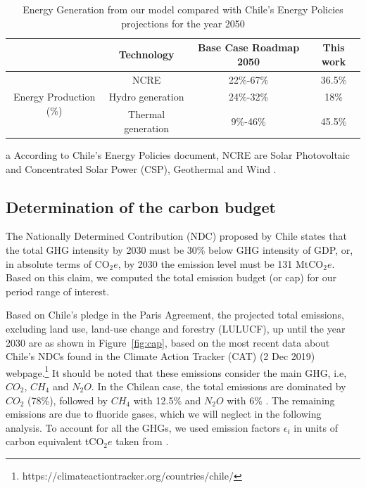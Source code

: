 \documentclass[11pt, letterpaper]{article}
\begin{document}
\begin{table}[!htbp]
\centering
  \begin{threeparttable}[t]
       \begin{tabular}{ c c c c } 
\hline
 & Technology & Base Case Roadmap 2050 & This work \\
\hline
\multirow{4}{8em}{Energy Production (\%)} & NCRE\tnote{a} & 22\%-67\% & 36.5\% \\ 
 & Hydro generation & 24\%-32\% & 18\% \\ 
& Thermal generation & 9\%-46\% & 45.5\% \\
\hline
\end{tabular}
     \begin{tablenotes}
     \footnotesize{
     \item[a] According to Chile's Energy Policies document, NCRE are Solar Photovoltaic and Concentrated Solar Power (CSP), Geothermal and Wind .
     }
   \end{tablenotes}
    \end{threeparttable}%
    \caption{Energy Generation from our model compared with Chile's Energy Policies projections for the year 2050}
  \label{tab:bc_comp}%
\end{table}%



\subsection{Determination of the carbon budget}\label{sec:cap}

The Nationally Determined Contribution (NDC) proposed by Chile states that the total GHG intensity by 2030 must be 30\% below GHG intensity of GDP, or, in absolute terms of CO$_2e$, by 2030 the emission level must be 131 MtCO$_2e$. Based on this claim, we computed the total emission budget (or cap) for our period range of interest. 
\smallskip

Based on Chile's pledge in the Paris Agreement, the projected total emissions, excluding land use, land-use change and  forestry (LULUCF), up until the year 2030 are as shown in Figure~\ref{fig:cap}, based on the most recent data about Chile's NDCs found in the Climate Action Tracker (CAT) (2 Dec 2019) webpage.\footnote{https://climateactiontracker.org/countries/chile/} It should be noted that these emissions consider the main GHG, i.e, $CO_2$, $CH_4$ and $N_2O$.  In the Chilean case, the total emissions are dominated by $CO_2$ (78\%), followed by $CH_4$ with 12.5\% and $N_2O$  with 6\% \cite{ChileInformeBienal2016}. The remaining emissions are due to fluoride gases, which we will neglect in the following analysis. To account for all the GHGs, we used emission factors $\epsilon_i$ in units of carbon equivalent tCO$_2e$ taken from \cite{IPCC2014}.
\end{document}
